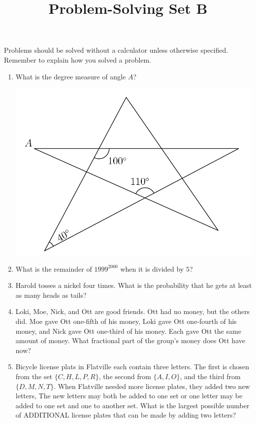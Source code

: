 \documentclass{article}
\title{Problem-Solving Set B}
\author{}
\date{}
\begin{document}
\maketitle
\noindent Problems should be solved without a calculator unless otherwise specified.
Remember to explain how you solved a problem.
\begin{multicols}{2}
    \begin{enumerate}
        \item What is the degree measure of angle $A$?
            \begin{center}
                \includegraphics[scale=0.15]{star.png}
            \end{center}
            \vspace{3cm}
        \item What is the remainder of $1999^{2000}$ when it is divided by $5$?
            \vspace{3cm}
        \item Harold tosses a nickel four times.
            What is the probability that he gets at least as many heads as tails?
            \vspace{3cm}
        \item Loki, Moe, Nick, and Ott are good friends.
            Ott had no money, but the others did.
            Moe gave Ott one-fifth of his money, Loki gave Ott one-fourth of his money, and Nick gave Ott one-third of his money.
            Each gave Ott the same amount of money.
            What fractional part of the group's money does Ott have now?
            \vspace{3cm}
        \item Bicycle license plats in Flatville each contain three letters.
            The first is chosen from the set $\{C,H,L,P,R\}$, the second from $\{A,I,O\}$, and the third from $\{D,M,N,T\}$.
            When Flatville needed more license plates, they added two new letters, The new letters may both be added to one set or one letter may be added to one set and one to another set.
            What is the largest possible number of ADDITIONAL license plates that can be made by adding two letters?
            \vspace{3cm}
    \end{enumerate}
\end{multicols}
\end{document}
